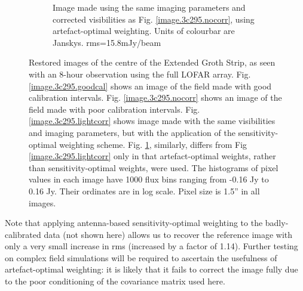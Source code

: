 \begin{figure}[h!]
\begin{subfigure}{.49\textwidth}
\caption{\label{image.3c295.fullcorr} Image made using the same imaging parameters and corrected visibilities as Fig. \ref{image.3c295.nocorr}, using artefact-optimal weighting. {Units of colourbar are Janskys}. rms=15.8mJy/beam}
\end{subfigure}
\caption{\label{image.fourRealImages}Restored images of the centre of the Extended Groth Strip, as seen with an 8-hour observation using the full LOFAR array. Fig. \ref{image.3c295.goodcal} shows an image of the field made with good calibration intervals. Fig. \ref{image.3c295.nocorr} shows an image of the field made with poor calibration intervals. Fig. \ref{image.3c295.lightcorr} shows image made with the same visibilities and imaging parameters, but with the application of the sensitivity-optimal weighting scheme. Fig. \ref{image.3c295.fullcorr}, similarly, differs from Fig \ref{image.3c295.lightcorr} only in that artefact-optimal weights, rather than sensitivity-optimal weights, were used. {The histograms of pixel values in each image have 1000 flux bins ranging from -0.16 Jy to 0.16 Jy. Their ordinates are in log scale.} Pixel size is 1.5'' in all images.}
\end{figure}

\pg
Note that applying antenna-based sensitivity-optimal weighting to the badly-calibrated data (not shown here) allows us to recover the reference image with only a very small increase in rms (increased by a factor of 1.14). Further testing on complex field simulations will be required to ascertain the usefulness of artefact-optimal weighting: it is likely that it fails to correct the image fully due to the poor conditioning of the covariance matrix used here.

